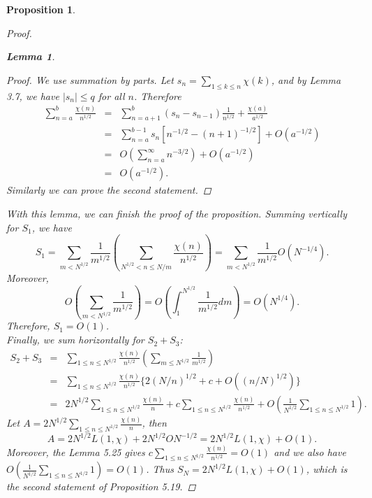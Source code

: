 \documentclass[psamsfonts]{amsart}
\newtheorem{prop}[thm]{Proposition}
\newtheorem{lem}[thm]{Lemma}
\theoremstyle{definition}
\theoremstyle{remark}
\numberwithin{equation}{section}
\begin{document}
\begin{prop}
\begin{proof}
\begin{lem}
						\begin{proof}
							We use summation by parts. Let $s_n = \sum_{1 \leq k \leq n} \chi(k)$, and by Lemma 3.7, we have $|s_n| \leq q$ for all $n$. Therefore													\begin{eqnarray}
								\sum_{n=a}^{b} \frac{\chi(n)}{n^{1/2}} &=& \sum_{n=a+1}^{b} (s_n-s_{n-1})\frac{1}{n^{1/2}} + \frac{\chi(a)}{a^{1/2}} \nonumber \\
								&=& \sum_{n=a}^{b-1} s_n[n^{-1/2}-(n+1)^{-1/2}] +O(a^{-1/2}) \nonumber \\
								&=& O(\sum_{n=a}^{\infty} n^{-3/2}) + O(a^{-1/2}) \nonumber \\
								&=& O(a^{-1/2}).
							\end{eqnarray}
							Similarly we can prove the second statement.
						\end{proof}
					\end{lem}					
					With this lemma, we can finish the proof of the proposition. Summing vertically for $S_1$, we have
					\begin{equation}
						S_1 = \sum_{m < N^{1/2}} \frac{1}{m^{1/2}} \left(\sum_{N^{1/2} < n \leq N/m} \frac{\chi(n)}{n^{1/2}}\right) = \sum_{m < N^{1/2}} \frac{1}{m^{1/2}} O(N^{-1/4}).
					\end{equation}										
					Moreover, 
					\begin{equation}
						O\left(\sum_{m < N^{1/2}} \frac{1}{m^{1/2}}\right) = O\left(\int_{1}^{N^{1/2}}\frac{1}{m^{1/2}}dm\right) = O(N^{1/4}).
					\end{equation}
					Therefore, $S_1 = O(1)$.\\
					Finally, we sum horizontally for $S_2 + S_3$:
					\begin{eqnarray}
						S_2+S_3 &=& \sum_{1 \leq n \leq N^{1/2}} \frac{\chi(n)}{n^{1/2}}\left(\sum_{m \leq N^{1/2}} \frac{1}{m^{1/2}}\right) \nonumber \\
						&=& \sum_{1 \leq n \leq N^{1/2}} \frac{\chi(n)}{n^{1/2}}\{2(N/n)^{1/2} + c + O((n/N)^{1/2})\} \nonumber \\
						&=& 2N^{1/2} \sum_{1 \leq n \leq N^{1/2}}\frac{\chi(n)}{n} + c\sum_{1 \leq n \leq N^{1/2}} \frac{\chi(n)}{n^{1/2}} +O(\frac{1}{N^{1/2}} \sum_{1 \leq n \leq N^{1/2}} 1).
					\end{eqnarray}
					Let $A = 2N^{1/2} \sum_{1 \leq n \leq N^{1/2}}\frac{\chi(n)}{n}$, then 
					\begin{equation}
						A = 2N^{1/2}L(1,\chi) + 2N^{1/2}O{N^{-1/2}} = 2N^{1/2}L(1,\chi) + O(1).
					\end{equation}
					Moreover, the Lemma 5.25 gives $c\sum_{1 \leq n \leq N^{1/2}} \frac{\chi(n)}{n^{1/2}} = O(1)$ and we also have \\ $O(\frac{1}{N^{1/2}} \sum_{1 \leq n \leq N^{1/2}} 1) = O(1)$. Thus $S_N = 2N^{1/2}L(1,\chi) + O(1)$, which is the second statement of Proposition 5.19.
				\end{proof}
			\end{prop}
\end{document}
